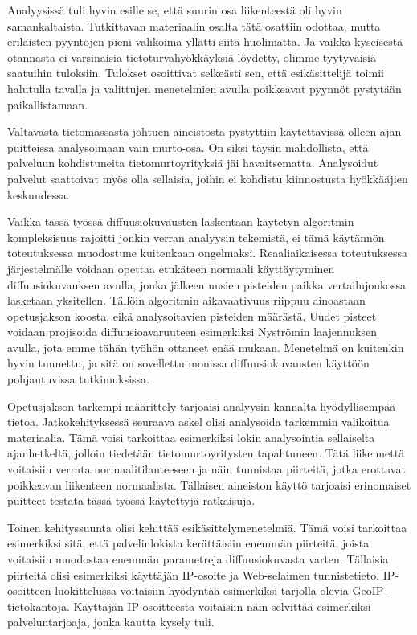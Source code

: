 Analyysissä tuli hyvin esille se, että suurin osa liikenteestä oli
hyvin samankaltaista. Tutkittavan materiaalin osalta tätä osattiin
odottaa, mutta erilaisten pyyntöjen pieni valikoima yllätti siitä
huolimatta. Ja vaikka kyseisestä otannasta ei varsinaisia
tietoturvahyökkäyksiä löydetty, olimme tyytyväisiä saatuihin
tuloksiin. Tulokset osoittivat selkeästi sen, että esikäsittelijä
toimii halutulla tavalla ja valittujen menetelmien avulla poikkeavat
pyynnöt pystytään paikallistamaan.

Valtavasta tietomassasta johtuen aineistosta pystyttiin käytettävissä
olleen ajan puitteissa analysoimaan vain murto-osa. On siksi täysin
mahdollista, että palveluun kohdistuneita tietomurtoyrityksiä jäi
havaitsematta. Analysoidut palvelut saattoivat myös olla sellaisia,
joihin ei kohdistu kiinnostusta hyökkääjien keskuudessa.

Vaikka tässä työssä diffuusiokuvausten laskentaan käytetyn algoritmin
kompleksisuus rajoitti jonkin verran analyysin tekemistä, ei tämä
käytännön toteutuksessa muodostune kuitenkaan
ongelmaksi. Reaaliaikaisessa toteutuksessa järjestelmälle voidaan
opettaa etukäteen normaali käyttäytyminen diffuusiokuvauksen avulla,
jonka jälkeen uusien pisteiden paikka vertailujoukossa lasketaan
yksitellen. Tällöin algoritmin aikavaativuus riippuu ainoastaan
opetusjakson koosta, eikä analysoitavien pisteiden määrästä. Uudet
pisteet voidaan projisoida diffuusioavaruuteen esimerkiksi Nyströmin
laajennuksen avulla, jota emme tähän työhön ottaneet enää
mukaan. Menetelmä on kuitenkin hyvin tunnettu, ja sitä on sovellettu
monissa diffuusiokuvausten käyttöön pohjautuvissa tutkimuksissa.


Opetusjakson tarkempi määrittely tarjoaisi analyysin kannalta
hyödyllisempää tietoa. Jatkokehityksessä seuraava askel olisi
analysoida tarkemmin valikoitua materiaalia. Tämä voisi tarkoittaa
esimerkiksi lokin analysointia sellaiselta ajanhetkeltä, jolloin tiedetään
tietomurtoyritysten tapahtuneen. Tätä liikennettä voitaisiin verrata
normaalitilanteeseen ja näin tunnistaa piirteitä, jotka erottavat
poikkeavan liikenteen normaalista.  Tällaisen aineiston käyttö
tarjoaisi erinomaiset puitteet testata tässä työssä käytettyjä
ratkaisuja.

Toinen kehityssuunta olisi kehittää esikäsittelymenetelmiä. Tämä voisi
tarkoittaa esimerkiksi sitä, että palvelinlokista kerättäisiin enemmän
piirteitä, joista voitaisiin muodostaa enemmän parametreja
diffuusiokuvasta varten. Tällaisia piirteitä olisi esimerkiksi
käyttäjän IP-osoite ja Web-selaimen tunnistetieto. IP-osoitteen
luokittelussa voitaisiin hyödyntää esimerkiksi tarjolla olevia
GeoIP-\-tietokantoja. Käyttäjän IP-osoitteesta voitaisiin näin
selvittää esimerkiksi palveluntarjoaja, jonka kautta kysely
tuli.


